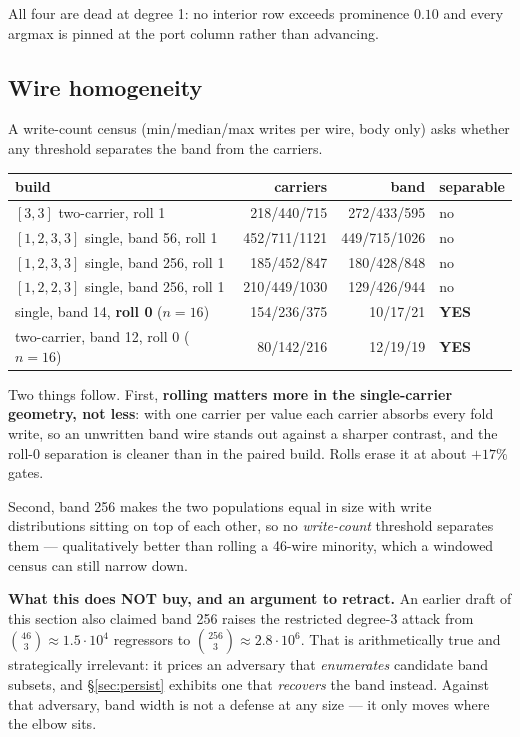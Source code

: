 \documentclass[11pt]{article}
\begin{document}
All four are dead at degree 1: no interior row exceeds prominence $0.10$ and
every argmax is pinned at the port column rather than advancing.

\subsection{Wire homogeneity}

A write-count census (min/median/max writes per wire, body only) asks whether
any threshold separates the band from the carriers.

\begin{center}
\begin{tabular}{lrrl}
\toprule
build & carriers & band & separable \\
\midrule
$[3,3]$ two-carrier, roll 1 & 218/440/715 & 272/433/595 & no \\
$[1,2,3,3]$ single, band 56, roll 1 & 452/711/1121 & 449/715/1026 & no \\
$[1,2,3,3]$ single, band 256, roll 1 & 185/452/847 & 180/428/848 & no \\
$[1,2,2,3]$ single, band 256, roll 1 & 210/449/1030 & 129/426/944 & no \\
\midrule
single, band 14, \textbf{roll 0} ($n{=}16$) & 154/236/375 & 10/17/21 & \textbf{YES} \\
two-carrier, band 12, roll 0 ($n{=}16$) & 80/142/216 & 12/19/19 & \textbf{YES} \\
\bottomrule
\end{tabular}
\end{center}

Two things follow. First, \textbf{rolling matters more in the single-carrier
geometry, not less}: with one carrier per value each carrier absorbs every fold
write, so an unwritten band wire stands out against a sharper contrast, and the
roll-0 separation is cleaner than in the paired build. Rolls erase it at about
$+17\%$ gates.

Second, band 256 makes the two populations equal in size with write
distributions sitting on top of each other, so no \emph{write-count} threshold
separates them --- qualitatively better than rolling a 46-wire minority, which
a windowed census can still narrow down.

\textbf{What this does NOT buy, and an argument to retract.} An earlier draft
of this section also claimed band 256 raises the restricted degree-3 attack
from $\binom{46}{3}\approx 1.5\cdot10^4$ regressors to
$\binom{256}{3}\approx 2.8\cdot10^6$. That is arithmetically true and
strategically irrelevant: it prices an adversary that \emph{enumerates}
candidate band subsets, and \S\ref{sec:persist} exhibits one that
\emph{recovers} the band instead. Against that adversary, band width is not a
defense at any size --- it only moves where the elbow sits.
\end{document}
